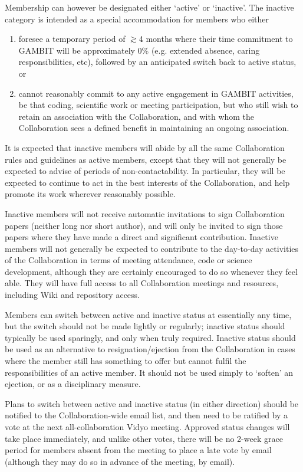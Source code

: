 Membership can however be designated either `active' or `inactive'.  The inactive category is intended as a special accommodation for members who either
\begin{enumerate}
\item foresee a temporary period of $\gtrsim$4 months where their time commitment to GAMBIT will be approximately 0\% (e.g. extended absence, caring responsibilities, etc), followed by an anticipated switch back to active status, or
\item cannot reasonably commit to any active engagement in GAMBIT activities, be that coding, scientific work or meeting participation, but who still wish to retain an association with the Collaboration, and with whom the Collaboration sees a defined benefit in maintaining an ongoing association.
\end{enumerate}
It is expected that inactive members will abide by all the same Collaboration rules and guidelines as active members, except that they will not generally be expected to advise of periods of non-contactability.  In particular, they will be expected to continue to act in the best interests of the Collaboration, and help promote its work wherever reasonably possible.

Inactive members will not receive automatic invitations to sign Collaboration papers (neither long nor short author), and will only be invited to sign those papers where they have made a direct and significant contribution.  Inactive members will not generally be expected to contribute to the day-to-day activities of the Collaboration in terms of meeting attendance, code or science development, although they are certainly encouraged to do so whenever they feel able.  They will have full access to all Collaboration meetings and resources, including Wiki and repository access.

Members can switch between active and inactive status at essentially any time, but the switch should not be made lightly or regularly; inactive status should typically be used sparingly, and only when truly required.  Inactive status should be used as an alternative to resignation/ejection from the Collaboration in cases where the member still has something to offer but cannot fulfil the responsibilities of an active member.  It should not be used simply to `soften' an ejection, or as a disciplinary measure.

Plans to switch between active and inactive status (in either direction) should be notified to the Collaboration-wide email list, and then need to be ratified by a vote at the next all-collaboration Vidyo meeting.  Approved status changes will take place immediately, and unlike other votes, there will be no 2-week grace period for members absent from the meeting to place a late vote by email (although they may do so in advance of the meeting, by email).

